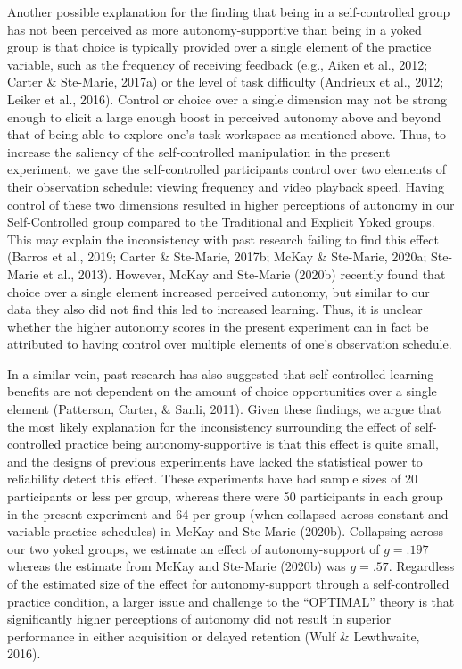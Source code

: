 \documentclass[
  english,
  man, donotrepeattitle,floatsintext]{apa7}
\begin{document}
Another possible explanation for the finding that being in a self-controlled group has not been perceived as more autonomy-supportive than being in a yoked group is that choice is typically provided over a single element of the practice variable, such as the frequency of receiving feedback (e.g., Aiken et al., 2012; Carter \& Ste-Marie, 2017a) or the level of task difficulty (Andrieux et al., 2012; Leiker et al., 2016). Control or choice over a single dimension may not be strong enough to elicit a large enough boost in perceived autonomy above and beyond that of being able to explore one's task workspace as mentioned above. Thus, to increase the saliency of the self-controlled manipulation in the present experiment, we gave the self-controlled participants control over two elements of their observation schedule: viewing frequency and video playback speed. Having control of these two dimensions resulted in higher perceptions of autonomy in our Self-Controlled group compared to the Traditional and Explicit Yoked groups. This may explain the inconsistency with past research failing to find this effect (Barros et al., 2019; Carter \& Ste-Marie, 2017b; McKay \& Ste-Marie, 2020a; Ste-Marie et al., 2013). However, McKay and Ste-Marie (2020b) recently found that choice over a single element increased perceived autonomy, but similar to our data they also did not find this led to increased learning. Thus, it is unclear whether the higher autonomy scores in the present experiment can in fact be attributed to having control over multiple elements of one's observation schedule.

In a similar vein, past research has also suggested that self-controlled learning benefits are not dependent on the amount of choice opportunities over a single element (Patterson, Carter, \& Sanli, 2011). Given these findings, we argue that the most likely explanation for the inconsistency surrounding the effect of self-controlled practice being autonomy-supportive is that this effect is quite small, and the designs of previous experiments have lacked the statistical power to reliability detect this effect. These experiments have had sample sizes of 20 participants or less per group, whereas there were 50 participants in each group in the present experiment and 64 per group (when collapsed across constant and variable practice schedules) in McKay and Ste-Marie (2020b). Collapsing across our two yoked groups, we estimate an effect of autonomy-support of \(g = .197\) whereas the estimate from McKay and Ste-Marie (2020b) was \(g = .57\). Regardless of the estimated size of the effect for autonomy-support through a self-controlled practice condition, a larger issue and challenge to the ``OPTIMAL'' theory is that significantly higher perceptions of autonomy did not result in superior performance in either acquisition or delayed retention (Wulf \& Lewthwaite, 2016).
\end{document}
